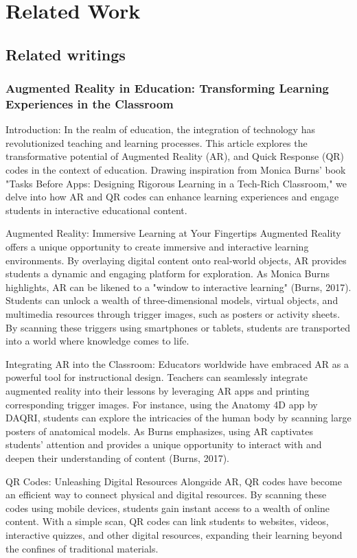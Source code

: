 \chapter{Related Work}\label{cap:relatedwork}
\section{Related writings}
\subsection*{Augmented Reality in Education: Transforming Learning Experiences in the Classroom}

Introduction: In the realm of education, the integration of technology has revolutionized teaching and learning processes. This article explores the transformative potential of Augmented Reality (AR), and Quick Response (QR) codes in the context of education. Drawing inspiration from Monica Burns' book "Tasks Before Apps: Designing Rigorous Learning in a Tech-Rich Classroom," we delve into how AR and QR codes can enhance learning experiences and engage students in interactive educational content.

Augmented Reality: Immersive Learning at Your Fingertips Augmented Reality offers a unique opportunity to create immersive and interactive learning environments. By overlaying digital content onto real-world objects, AR provides students a dynamic and engaging platform for exploration. As Monica Burns highlights, AR can be likened to a "window to interactive learning" (Burns, 2017). Students can unlock a wealth of three-dimensional models, virtual objects, and multimedia resources through trigger images, such as posters or activity sheets. By scanning these triggers using smartphones or tablets, students are transported into a world where knowledge comes to life.

Integrating AR into the Classroom: Educators worldwide have embraced AR as a powerful tool for instructional design. Teachers can seamlessly integrate augmented reality into their lessons by leveraging AR apps and printing corresponding trigger images. For instance, using the Anatomy 4D app by DAQRI, students can explore the intricacies of the human body by scanning large posters of anatomical models. As Burns emphasizes, using AR captivates students' attention and provides a unique opportunity to interact with and deepen their understanding of content (Burns, 2017).

QR Codes: Unleashing Digital Resources Alongside AR, QR codes have become an efficient way to connect physical and digital resources. By scanning these codes using mobile devices, students gain instant access to a wealth of online content. With a simple scan, QR codes can link students to websites, videos, interactive quizzes, and other digital resources, expanding their learning beyond the confines of traditional materials.

